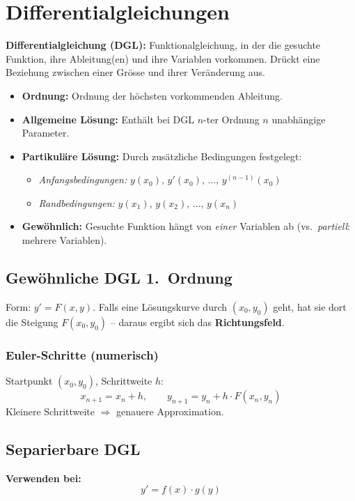 \section{Differentialgleichungen}

\textbf{Differentialgleichung (DGL):} Funktionalgleichung, in der die gesuchte Funktion, ihre Ableitung(en) und ihre Variablen vorkommen. Drückt eine Beziehung zwischen einer Grösse und ihrer Veränderung aus.

\begin{itemize}
    \item \textbf{Ordnung:} Ordnung der höchsten vorkommenden Ableitung.
    \item \textbf{Allgemeine Lösung:} Enthält bei DGL $n$-ter Ordnung $n$ unabhängige Parameter.
    \item \textbf{Partikuläre Lösung:} Durch zusätzliche Bedingungen festgelegt:
    \begin{itemize}
        \item \textit{Anfangsbedingungen:} $y(x_0),\, y'(x_0),\, \dots,\, y^{(n-1)}(x_0)$
        \item \textit{Randbedingungen:} $y(x_1),\, y(x_2),\, \dots,\, y(x_n)$
    \end{itemize}
    \item \textbf{Gewöhnlich:} Gesuchte Funktion hängt von \textit{einer} Variablen ab (vs.\ \textit{partiell}: mehrere Variablen).
\end{itemize}

\subsection{Gewöhnliche DGL 1.\ Ordnung}
Form: $y' = F(x,y)$.
Falls eine Lösungskurve durch $(x_0, y_0)$ geht, hat sie dort die Steigung $F(x_0, y_0)$ -- daraus ergibt sich das \textbf{Richtungsfeld}.

\subsubsection{Euler-Schritte (numerisch)}
Startpunkt $(x_0, y_0)$, Schrittweite $h$:
\[
    x_{n+1} = x_n + h, \qquad y_{n+1} = y_n + h \cdot F(x_n, y_n)
\]
Kleinere Schrittweite $\Rightarrow$ genauere Approximation.

\subsection{Separierbare DGL}
\textbf{Verwenden bei:}
\[y' = f(x) \cdot g(y)\]

